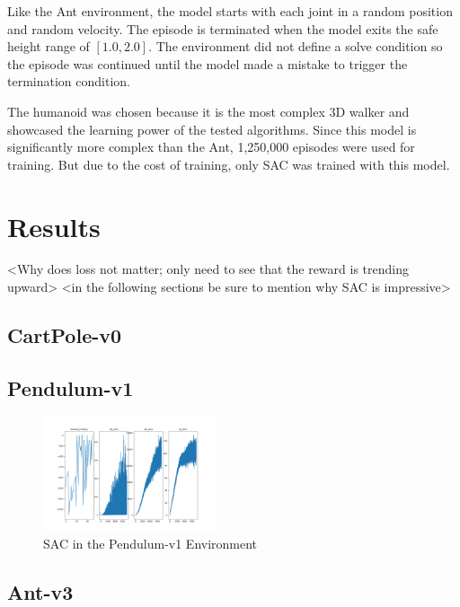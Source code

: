 \documentclass[conference]{IEEEtran}
\begin{document}
Like the Ant environment, the model starts with each joint in a random position and random velocity. The episode is terminated when the model exits the safe height range of $[1.0, 2.0]$. The environment did not define a solve condition so the episode was continued until the model made a mistake to trigger the termination condition.

The humanoid was chosen because it is the most complex 3D walker and showcased the learning power of the tested algorithms. Since this model is significantly more complex than the Ant, 1,250,000 episodes were used for training. But due to the cost of training, only SAC was trained with this model.

\section{Results}

<Why does loss not matter; only need to see that the reward is trending upward>
<in the following sections be sure to mention why SAC is impressive>

\blindtext

\subsection{CartPole-v0}

\blindtext

\subsection{Pendulum-v1}

\begin{figure}
    \includegraphics[width=0.45\textwidth]{sac-pendulum}
    \caption{SAC in the Pendulum-v1 Environment}
\end{figure}

\blindtext

\subsection{Ant-v3}
\end{document}

